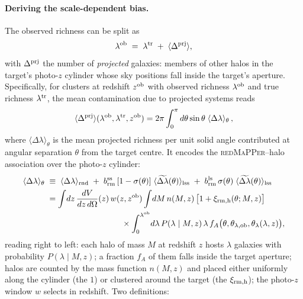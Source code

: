 \documentclass[a4paper, 11pt]{article}
\newcommand{\lob}{\lambda^{\rm ob}}
\newcommand{\ltr}{\lambda^{\rm tr}}
\newcommand{\zob}{z^{\rm ob}}
\newcommand{\dprj}{\Delta^{\rm prj}}
\newcommand{\thob}{\theta_{\lambda,{\rm ob}}}
\newcommand{\brmss}{b_{\rm rm}^{\rm ss}}
\newcommand{\brmls}{b_{\rm rm}^{\rm ls}}
\newcommand{\Dl}{\langle \Delta\lambda\rangle}
\newcommand{\Dp}{\langle \dprj\rangle}
\newcommand{\Dlrnd}{\langle \Delta\lambda\rangle_{\rm rnd}}
\newcommand{\tDllss}[1]{\langle \widetilde{\Delta\lambda}(#1)\rangle_{\rm lss}}
\begin{document}
\paragraph{Deriving the scale-dependent bias.} The observed
richness can be split as
\begin{equation}
\lob \;=\; \ltr \;+\; \Dp,
\label{eq:lob_split}
\end{equation}
with $\dprj$ the number of \emph{projected} galaxies: members of
other halos in the target's photo-$z$ cylinder whose sky positions
fall inside the target's aperture. Specifically, for clusters at
redshift $\zob$ with observed richness $\lob$ and true richness
$\ltr$, the mean contamination due to projected systems reads
\begin{equation}
\Dp(\lob,\ltr,\zob)
= 2\pi\int_0^{\pi} d\theta \sin\theta \;
\Dl_\theta \,,
\label{eq:Dprj_outer}
\end{equation}
where $\Dl_\theta$ is the mean projected richness per unit solid
angle contributed at angular separation $\theta$ from the target
centre. It encodes the \textsc{redMaPPer}--halo association over
the photo-$z$ cylinder:
\begin{align}
\Dl_\theta
\;&\equiv\; \Dlrnd
\;+\; \brmss\,[1-\sigma(\theta)]\; \tDllss{\theta}
\;+\; \brmls\,\sigma(\theta)\; \tDllss{\theta}
\label{eq:Dlam_split}\\
&=\int\!dz\,\frac{dV}{dz\,d\Omega}(z)\,
w(z,\zob) \int\!dM\,n(M,z)\,
\big[1+\xi_{\rm rm,h}(\theta;M,z)\big]
\notag\\
&\hspace{9em}\times
\int_0^{\lob}\!d\lambda\,P(\lambda\mid M, z)\,\lambda\,
f_A\big(\theta,\thob,\theta_\lambda(\lambda,z)\big),
\label{eq:Pop}
\end{align}
reading right to left: each halo of mass $M$ at redshift $z$
hosts $\lambda$ galaxies with probability $P(\lambda\mid M,z)$; a
fraction $f_A$ of them falls inside the target aperture; halos
are counted by the mass function $n(M,z)$ and placed either
uniformly along the cylinder (the $1$) or clustered around the
target (the $\xi_{\rm rm,h}$); the photo-$z$ window $w$ selects
in redshift. Two definitions:
\end{document}
